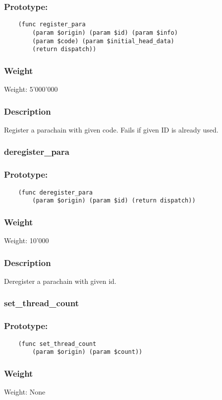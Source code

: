 \documentclass[11pt,a4paper]{article}
\begin{document}
\subsubsection*{Prototype:}
\begin{verbatim}
    (func register_para
        (param $origin) (param $id) (param $info)
        (param $code) (param $initial_head_data)
        (return dispatch))
\end{verbatim}
\subsubsection*{Weight}
Weight: 5'000'000 
\subsubsection*{Description}
Register a parachain with given code. Fails if given ID is already used.

\subsubsection{deregister\_para}
\subsubsection*{Prototype:}
\begin{verbatim}
    (func deregister_para
        (param $origin) (param $id) (return dispatch))
\end{verbatim}
\subsubsection*{Weight}
Weight: 10'000 
\subsubsection*{Description}
Deregister a parachain with given id.

\subsubsection{set\_thread\_count}
\subsubsection*{Prototype:}
\begin{verbatim}
    (func set_thread_count
        (param $origin) (param $count))
\end{verbatim}
\subsubsection*{Weight}
Weight: None
\end{document}
